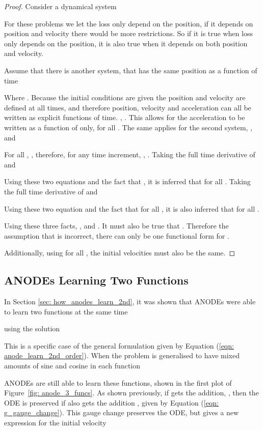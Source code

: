 \documentclass{article}
\theoremstyle{remark}
\theoremstyle{definition}
\begin{document}
\begin{proof}
Consider a dynamical system


For these problems we let the loss only depend on the position, if it depends on position and velocity there would be more restrictions. So if it is true when loss only depends on the position, it is also true when it depends on both position and velocity.

Assume that there is another system, that has the same position as a function of time


Where . Because the initial conditions are given the position and velocity are defined at all times, and therefore position, velocity and acceleration can all be written as explicit functions of time. , . This allows for the acceleration to be written as a function of  only,  for all . The same applies for the second system, ,  and 


For all , , therefore, for any time increment, , . Taking the full time derivative of  and 



Using these two equations and the fact that , it is inferred that  for all . Taking the full time derivative of  and 



Using these two equation and the fact that  for all , it is also inferred that  for all .

Using these three facts, ,  and . It must also be true that . Therefore the assumption that  is incorrect, there can only be one functional form for .

Additionally, using  for all , the initial velocities must also be the same.

\end{proof}

\subsection{ANODEs Learning Two Functions}

In Section \ref{sec: how_anodes_learn_2nd}, it was shown that ANODEs were able to learn two functions at the same time

using the solution


This is a specific case of the general formulation given by Equation (\ref{eqn: anode_learn_2nd_order}). When the problem is generalised to have mixed amounts of sine and cosine in each function


ANODEs are still able to learn these functions, shown in the first plot of Figure~\ref{fig: anode_3_funcs}. As shown previously, if 
 gets the addition, , then the ODE is preserved if  also gets the addition , given by Equation (\ref{eqn: g_gauge_change}). This gauge change preserves the ODE, but gives a new expression for the initial velocity
\end{document}
